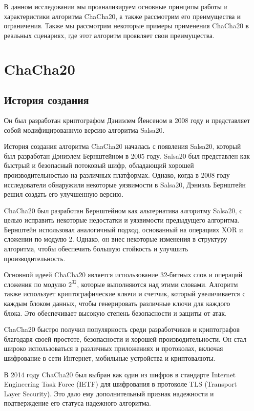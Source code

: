 \documentclass[12pt]{article}
\begin{document}
    В данном исследовании мы проанализируем основные принципы работы и характеристики алгоритма ChaCha20, а также рассмотрим его преимущества и ограничения.
    Также мы рассмотрим некоторые примеры применения ChaCha20 в реальных сценариях, где этот алгоритм проявляет свои преимущества.

    \newpage


    \section{ChaCha20}

    \subsection{История создания}
    Он был разработан криптографом Дэниэлем Йенсеном в 2008 году и представляет собой модифицированную версию алгоритма Salsa20.

    История создания алгоритма ChaCha20 началась с появления Salsa20, который был разработан Дэниэлем Бернштейном в 2005 году.
    Salsa20 был представлен как быстрый и безопасный потоковый шифр, обладающий хорошей производительностью на различных платформах.
    Однако, когда в 2008 году исследователи обнаружили некоторые уязвимости в Salsa20, Дэниэль Бернштейн решил создать его улучшенную версию.

    ChaCha20 был разработан Бернштейном как альтернатива алгоритму Salsa20, с целью исправить некоторые недостатки и уязвимости предыдущего алгоритма.
    Бернштейн использовал аналогичный подход, основанный на операциях XOR и сложении по модулю 2.
    Однако, он внес некоторые изменения в структуру алгоритма, чтобы обеспечить большую стойкость и улучшить производительность.

    Основной идеей ChaCha20 является использование 32-битных слов и операций сложения по модулю $2^{32}$, которые выполняются над этими словами.
    Алгоритм также использует криптографические ключи и счетчик, который увеличивается с каждым блоком данных, чтобы генерировать различные ключи для каждого блока.
    Это обеспечивает высокую степень безопасности и защиты от атак.

    ChaCha20 быстро получил популярность среди разработчиков и криптографов благодаря своей простоте, безопасности и хорошей производительности.
    Он стал широко использоваться в различных приложениях и протоколах, включая шифрование в сети Интернет, мобильные устройства и криптовалюты.

    В 2014 году ChaCha20 был выбран как один из шифров в стандарте Internet Engineering Task Force (IETF) для шифрования в протоколе TLS (Transport Layer Security).
    Это дало ему дополнительный признак надежности и подтверждение его статуса надежного алгоритма.
\end{document}
